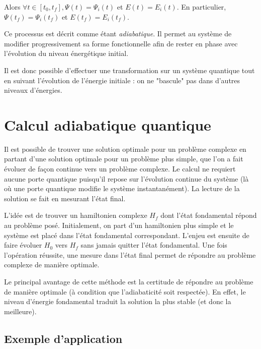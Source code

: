 \documentclass{article}
\begin{document}
\bigskip

Alors $\forall t\in[t_0, t_f], \Psi(t)=\Psi_i(t)$ et $E(t)=E_i(t)$. En particulier, $\Psi(t_f)=\Psi_i(t_f)$ et $E(t_f)=E_i(t_f)$.

\medskip

\noindent Ce processus est décrit comme étant \emph{adiabatique}. Il permet au système de modifier progressivement sa forme fonctionnelle afin de rester en phase avec l'évolution du niveau énergétique initial.

\medskip

\noindent Il est donc possible d'effectuer une transformation sur un système quantique tout en suivant l'évolution de l'énergie initiale : on ne "bascule" pas dans d'autres niveaux d'énergies. \cite{wiki2023adiabatictheorem} \cite{mitocw2023}

\section{Calcul adiabatique quantique}

Il est possible de trouver une solution optimale pour un problème complexe en partant d'une solution optimale pour un problème plus simple, que l'on a fait évoluer de façon continue vers un problème complexe. Le calcul ne requiert aucune porte quantique puisqu'il repose sur l'évolution continue du système (là où une porte quantique modifie le système instantanément). La lecture de la solution se fait en mesurant l'état final.

\medskip

\noindent L'idée est de trouver un hamiltonien complexe $H_f$ dont l'état fondamental répond au problème posé. Initialement, on part d'un hamiltonien plus simple et le système est placé dans l'état fondamental correspondant. L'enjeu est ensuite de faire évoluer $H_0$ vers $H_f$ sans jamais quitter l'état fondamental. Une fois l'opération réussite, une mesure dans l'état final permet de répondre au problème complexe de manière optimale. \cite{wiki2023adiabaticquantumcomputing} \cite{delahaye2016memoire}

\medskip
\noindent Le principal avantage de cette méthode est la certitude de répondre au problème de manière optimale (à condition que l'adiabaticité soit respectée). En effet, le niveau d'énergie fondamental traduit la solution la plus stable (et donc la meilleure).

\subsection{Exemple d'application}
\end{document}
